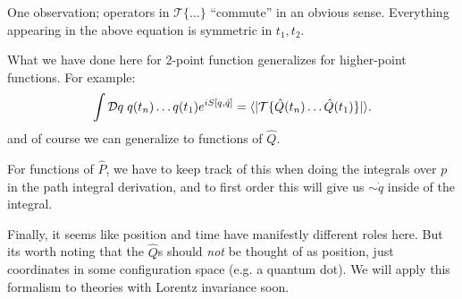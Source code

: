One observation; operators in $\mathcal{T}\{\ldots \}$ ``commute'' in an obvious sense. Everything appearing in the above equation is symmetric in $t_1, t_2$.

What we have done here for 2-point function generalizes for higher-point functions. For example:
\begin{equation}
    \int \mathcal{D}q \; q(t_n)\ldots q(t_1) e^{iS[q, \dot{q}]} = \langle  \rvert\mathcal{T}\{\hat{Q}(t_n)\ldots \hat{Q}(t_1)\}\lvert  \rangle.
\end{equation}
and of course we can generalize to functions of $\hat{Q}$.

For functions of $\hat{P}$, we have to keep track of this when doing the integrals over $p$ in the path integral derivation, and to first order this will give us $\sim \dot{q}$ inside of the integral.

Finally, it seems like position and time have manifestly different roles here. But its worth noting that the $\hat{Q}$s should \emph{not} be thought of as position, just coordinates in some configuration space (e.g. a quantum dot). We will apply this formalism to theories with Lorentz invariance soon.